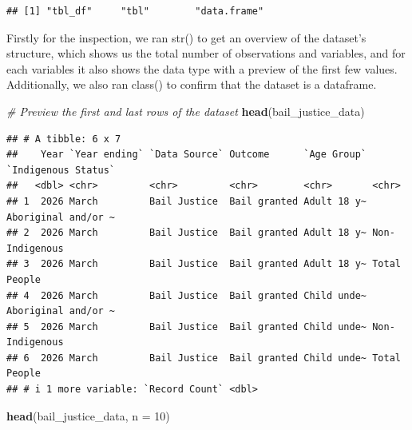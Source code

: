 \documentclass[
]{article}
\newenvironment{Shaded}{\begin{snugshade}}{\end{snugshade}}
\newcommand{\AttributeTok}[1]{\textcolor[rgb]{0.13,0.29,0.53}{#1}}
\newcommand{\CommentTok}[1]{\textcolor[rgb]{0.56,0.35,0.01}{\textit{#1}}}
\newcommand{\DecValTok}[1]{\textcolor[rgb]{0.00,0.00,0.81}{#1}}
\newcommand{\FunctionTok}[1]{\textcolor[rgb]{0.13,0.29,0.53}{\textbf{#1}}}
\newcommand{\NormalTok}[1]{#1}
\begin{document}
\begin{verbatim}
## [1] "tbl_df"     "tbl"        "data.frame"
\end{verbatim}

Firstly for the inspection, we ran str() to get an overview of the
dataset's structure, which shows us the total number of observations and
variables, and for each variables it also shows the data type with a
preview of the first few values. Additionally, we also ran class() to
confirm that the dataset is a dataframe.

\begin{Shaded}
\begin{Highlighting}[]
\CommentTok{\# Preview the first and last rows of the dataset}
\FunctionTok{head}\NormalTok{(bail\_justice\_data)}
\end{Highlighting}
\end{Shaded}

\begin{verbatim}
## # A tibble: 6 x 7
##    Year `Year ending` `Data Source` Outcome      `Age Group` `Indigenous Status`
##   <dbl> <chr>         <chr>         <chr>        <chr>       <chr>              
## 1  2026 March         Bail Justice  Bail granted Adult 18 y~ Aboriginal and/or ~
## 2  2026 March         Bail Justice  Bail granted Adult 18 y~ Non-Indigenous     
## 3  2026 March         Bail Justice  Bail granted Adult 18 y~ Total People       
## 4  2026 March         Bail Justice  Bail granted Child unde~ Aboriginal and/or ~
## 5  2026 March         Bail Justice  Bail granted Child unde~ Non-Indigenous     
## 6  2026 March         Bail Justice  Bail granted Child unde~ Total People       
## # i 1 more variable: `Record Count` <dbl>
\end{verbatim}

\begin{Shaded}
\begin{Highlighting}[]
\FunctionTok{head}\NormalTok{(bail\_justice\_data, }\AttributeTok{n =} \DecValTok{10}\NormalTok{)}
\end{Highlighting}
\end{Shaded}
\end{document}

